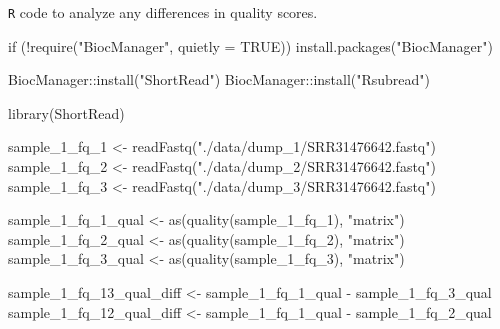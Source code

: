 \documentclass[
  letterpaper,
]{article}
\newenvironment{Shaded}{\begin{snugshade}}{\end{snugshade}}
\newcommand{\AttributeTok}[1]{\textcolor[rgb]{0.40,0.45,0.13}{#1}}
\newcommand{\ConstantTok}[1]{\textcolor[rgb]{0.56,0.35,0.01}{#1}}
\newcommand{\ControlFlowTok}[1]{\textcolor[rgb]{0.00,0.23,0.31}{#1}}
\newcommand{\FunctionTok}[1]{\textcolor[rgb]{0.28,0.35,0.67}{#1}}
\newcommand{\NormalTok}[1]{\textcolor[rgb]{0.00,0.23,0.31}{#1}}
\newcommand{\OtherTok}[1]{\textcolor[rgb]{0.00,0.23,0.31}{#1}}
\newcommand{\SpecialCharTok}[1]{\textcolor[rgb]{0.37,0.37,0.37}{#1}}
\newcommand{\StringTok}[1]{\textcolor[rgb]{0.13,0.47,0.30}{#1}}
\begin{document}
\texttt{R} code to analyze any differences in quality scores.

\begin{Shaded}
\begin{Highlighting}[]
\ControlFlowTok{if}\NormalTok{ (}\SpecialCharTok{!}\FunctionTok{require}\NormalTok{(}\StringTok{"BiocManager"}\NormalTok{, }\AttributeTok{quietly =} \ConstantTok{TRUE}\NormalTok{))}
    \FunctionTok{install.packages}\NormalTok{(}\StringTok{"BiocManager"}\NormalTok{)}

\NormalTok{BiocManager}\SpecialCharTok{::}\FunctionTok{install}\NormalTok{(}\StringTok{"ShortRead"}\NormalTok{)}
\NormalTok{BiocManager}\SpecialCharTok{::}\FunctionTok{install}\NormalTok{(}\StringTok{"Rsubread"}\NormalTok{)}
\end{Highlighting}
\end{Shaded}

\begin{Shaded}
\begin{Highlighting}[]
\FunctionTok{library}\NormalTok{(ShortRead)}

\NormalTok{sample\_1\_fq\_1 }\OtherTok{\textless{}{-}} \FunctionTok{readFastq}\NormalTok{(}\StringTok{"./data/dump\_1/SRR31476642.fastq"}\NormalTok{) }
\NormalTok{sample\_1\_fq\_2 }\OtherTok{\textless{}{-}} \FunctionTok{readFastq}\NormalTok{(}\StringTok{"./data/dump\_2/SRR31476642.fastq"}\NormalTok{)}
\NormalTok{sample\_1\_fq\_3 }\OtherTok{\textless{}{-}} \FunctionTok{readFastq}\NormalTok{(}\StringTok{"./data/dump\_3/SRR31476642.fastq"}\NormalTok{)}
\end{Highlighting}
\end{Shaded}

\begin{Shaded}
\begin{Highlighting}[]
\NormalTok{sample\_1\_fq\_1\_qual }\OtherTok{\textless{}{-}} \FunctionTok{as}\NormalTok{(}\FunctionTok{quality}\NormalTok{(sample\_1\_fq\_1), }\StringTok{"matrix"}\NormalTok{)}
\NormalTok{sample\_1\_fq\_2\_qual }\OtherTok{\textless{}{-}} \FunctionTok{as}\NormalTok{(}\FunctionTok{quality}\NormalTok{(sample\_1\_fq\_2), }\StringTok{"matrix"}\NormalTok{)}
\NormalTok{sample\_1\_fq\_3\_qual }\OtherTok{\textless{}{-}} \FunctionTok{as}\NormalTok{(}\FunctionTok{quality}\NormalTok{(sample\_1\_fq\_3), }\StringTok{"matrix"}\NormalTok{)}

\NormalTok{sample\_1\_fq\_13\_qual\_diff }\OtherTok{\textless{}{-}}\NormalTok{ sample\_1\_fq\_1\_qual }\SpecialCharTok{{-}}\NormalTok{ sample\_1\_fq\_3\_qual}
\NormalTok{sample\_1\_fq\_12\_qual\_diff }\OtherTok{\textless{}{-}}\NormalTok{ sample\_1\_fq\_1\_qual }\SpecialCharTok{{-}}\NormalTok{ sample\_1\_fq\_2\_qual}
\end{Highlighting}
\end{Shaded}
\end{document}

